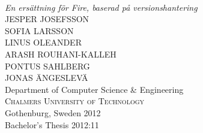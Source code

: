 \begin{titlepage}

\mbox{}
\vfill
\addtolength{\voffset}{2cm}
\begin{flushleft}
	{ \\[0.5cm]
	\emph{\Large En ersättning för Fire, baserad på versionshantering} \\[2.8cm]
	
	{\huge JESPER JOSEFSSON    }\\[.8cm]
	{\huge SOFIA LARSSON       }\\[.8cm]
	{\huge LINUS OLEANDER      }\\[.8cm]
	{\huge ARASH ROUHANI-KALLEH}\\[.8cm]
	{\huge PONTUS SAHLBERG     }\\[.8cm]
	{\huge JONAS ÄNGESLEVÄ     }\\[.8cm]
	
	{\Large Department of Computer Science \& Engineering \\
	\textsc{Chalmers University of Technology} \\
	Gothenburg, Sweden 2012 \\
	Bachelor's Thesis 2012:11\\
	} 
	}

\end{flushleft}

\end{titlepage}
\ClearShipoutPicture

\pagestyle{empty}
\newpage
\clearpage
\mbox{}
\newpage
\clearpage
\thispagestyle{empty}

